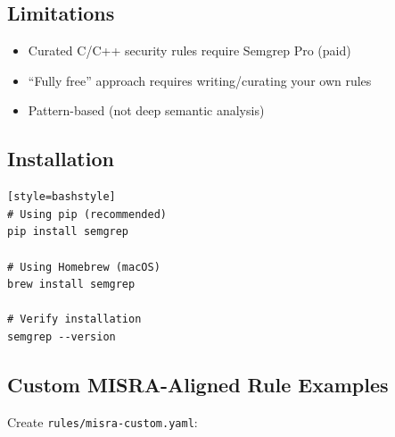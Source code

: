 \documentclass[11pt,letterpaper]{report}
\begin{document}
\subsection{Limitations}

\begin{itemize}[leftmargin=*]
    \item Curated C/C++ security rules require Semgrep Pro (paid)
    \item ``Fully free'' approach requires writing/curating your own rules
    \item Pattern-based (not deep semantic analysis)
\end{itemize}

\subsection{Installation}

\begin{verbatim}[style=bashstyle]
# Using pip (recommended)
pip install semgrep

# Using Homebrew (macOS)
brew install semgrep

# Verify installation
semgrep --version
\end{verbatim}

\subsection{Custom MISRA-Aligned Rule Examples}

Create \texttt{rules/misra-custom.yaml}:
\end{document}
